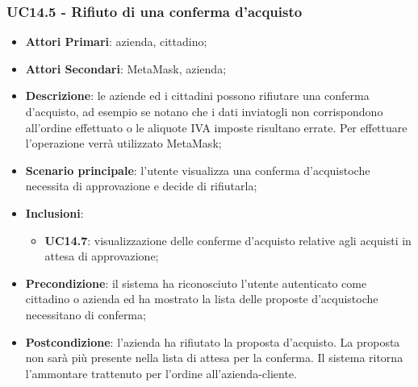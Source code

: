 \subsubsection{UC14.5 - Rifiuto di una conferma d'acquisto}
\begin{itemize}
	\item \textbf{Attori Primari}: azienda, cittadino;
	\item \textbf{Attori Secondari}: MetaMask\glo, azienda;
	\item \textbf{Descrizione}: le aziende ed i cittadini possono rifiutare una conferma d'acquisto\glo, ad esempio se notano che i dati inviatogli non corrispondono all'ordine effettuato o le aliquote IVA imposte risultano errate. Per effettuare l'operazione verrà utilizzato MetaMask\glo;
	\item \textbf{Scenario principale}: l'utente visualizza una conferma d'acquisto\glosp che necessita di approvazione e decide di rifiutarla;
	\item \textbf{Inclusioni}: 
	\begin{itemize}
		\item \textbf{UC14.7}: visualizzazione delle conferme d'acquisto relative agli acquisti in attesa di approvazione;
	\end{itemize}
	\item \textbf{Precondizione}: il sistema ha riconosciuto l'utente autenticato come cittadino o azienda ed ha mostrato la lista delle proposte d'acquisto\glosp che necessitano di conferma;
	\item \textbf{Postcondizione}: l'azienda ha rifiutato la proposta d'acquisto\glo. La proposta non sarà più presente nella lista di attesa per la conferma. Il sistema ritorna l'ammontare trattenuto per l'ordine all'azienda-cliente.
\end{itemize}
